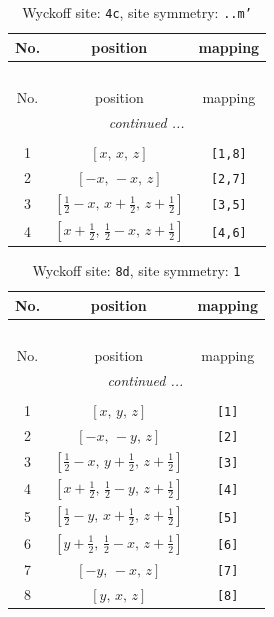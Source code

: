 \documentclass[fleqn,8pt]{jsarticle}
\begin{document}
\renewcommand{\arraystretch}{1.2}
\begin{longtable}{ccc}
\caption{Wyckoff site: {\tt 4c}, site symmetry: {\tt ..m'}}
 \\
 \hline \hline
No. & position & mapping \\ \hline \endfirsthead

\multicolumn{2}{l}{\tablename\ \thetable{}} \\
 \hline \hline
No. & position & mapping \\ \hline \endhead

 \hline \hline
\multicolumn{2}{r}{\footnotesize\it continued ...} \\ \endfoot

 \hline \hline
\multicolumn{2}{r}{} \\ \endlastfoot

1 & $\left[ x,\, x,\, z \right]$ & {\tt [1,8]} \\ \hline
2 & $\left[ - x,\, - x,\, z \right]$ & {\tt [2,7]} \\ \hline
3 & $\left[ \frac{1}{2} - x,\, x + \frac{1}{2},\, z + \frac{1}{2} \right]$ & {\tt [3,5]} \\ \hline
4 & $\left[ x + \frac{1}{2},\, \frac{1}{2} - x,\, z + \frac{1}{2} \right]$ & {\tt [4,6]} \\
\end{longtable}
\renewcommand{\arraystretch}{1.2}
\begin{longtable}{ccc}
\caption{Wyckoff site: {\tt 8d}, site symmetry: {\tt 1}}
 \\
 \hline \hline
No. & position & mapping \\ \hline \endfirsthead

\multicolumn{2}{l}{\tablename\ \thetable{}} \\
 \hline \hline
No. & position & mapping \\ \hline \endhead

 \hline \hline
\multicolumn{2}{r}{\footnotesize\it continued ...} \\ \endfoot

 \hline \hline
\multicolumn{2}{r}{} \\ \endlastfoot

1 & $\left[ x,\, y,\, z \right]$ & {\tt [1]} \\ \hline
2 & $\left[ - x,\, - y,\, z \right]$ & {\tt [2]} \\ \hline
3 & $\left[ \frac{1}{2} - x,\, y + \frac{1}{2},\, z + \frac{1}{2} \right]$ & {\tt [3]} \\ \hline
4 & $\left[ x + \frac{1}{2},\, \frac{1}{2} - y,\, z + \frac{1}{2} \right]$ & {\tt [4]} \\ \hline
5 & $\left[ \frac{1}{2} - y,\, x + \frac{1}{2},\, z + \frac{1}{2} \right]$ & {\tt [5]} \\ \hline
6 & $\left[ y + \frac{1}{2},\, \frac{1}{2} - x,\, z + \frac{1}{2} \right]$ & {\tt [6]} \\ \hline
7 & $\left[ - y,\, - x,\, z \right]$ & {\tt [7]} \\ \hline
8 & $\left[ y,\, x,\, z \right]$ & {\tt [8]} \\
\end{longtable}
\end{document}
